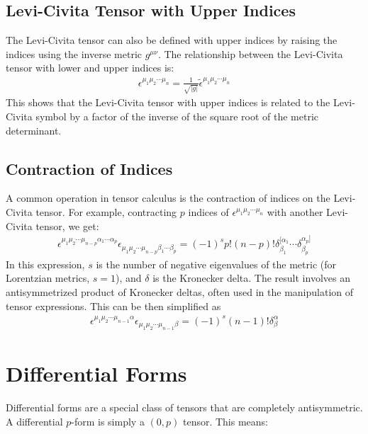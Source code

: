 \documentclass[11pt,letterpaper]{book}
\begin{document}
\subsection{Levi-Civita Tensor with Upper Indices}

The Levi-Civita tensor can also be defined with upper indices by raising the indices using the inverse metric \( g^{\mu\nu} \). The relationship between the Levi-Civita tensor with lower and upper indices is:
\begin{align}
\epsilon^{\mu_1 \mu_2 \cdots \mu_n} = \frac{1}{\sqrt{|g|}} \tilde{\epsilon}^{\mu_1 \mu_2 \cdots \mu_n}
\end{align}
This shows that the Levi-Civita tensor with upper indices is related to the Levi-Civita symbol by a factor of the inverse of the square root of the metric determinant.

\subsection{Contraction of Indices}

A common operation in tensor calculus is the contraction of indices on the Levi-Civita tensor. For example, contracting \( p \) indices of \( \epsilon^{\mu_1 \mu_2 \cdots \mu_n} \) with another Levi-Civita tensor, we get:
\begin{align}
\epsilon^{\mu_1 \mu_2 \cdots \mu_{n-p} \alpha_1 \cdots \alpha_p} \epsilon_{\mu_1 \mu_2 \cdots \mu_{n-p} \beta_1 \cdots \beta_p} = (-1)^s p! (n-p)! \delta^{[\alpha_1}_{\beta_1} \cdots \delta^{\alpha_p]}_{\beta_p}
\end{align}
In this expression, \( s \) is the number of negative eigenvalues of the metric (for Lorentzian metrics, \( s = 1 \)), and \( \delta \) is the Kronecker delta. The result involves an antisymmetrized product of Kronecker deltas, often used in the manipulation of tensor expressions. This can be then simplified as
\begin{align}
\epsilon^{\mu_1 \mu_2 \cdots \mu_{n-1} \alpha} \epsilon_{\mu_1 \mu_2 \cdots \mu_{n-1} \beta} = (-1)^s (n-1)! \delta^\alpha_\beta
\end{align}
\section{Differential Forms}

Differential forms are a special class of tensors that are completely antisymmetric. A differential \( p \)-form is simply a \( (0,p) \) tensor. This means:
\end{document}

